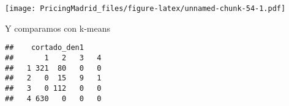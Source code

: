\documentclass[
]{article}
\newenvironment{Shaded}{\begin{snugshade}}{\end{snugshade}}
\newcommand{\FunctionTok}[1]{\textcolor[rgb]{0.00,0.00,0.00}{#1}}
\newcommand{\NormalTok}[1]{#1}
\newcommand{\SpecialCharTok}[1]{\textcolor[rgb]{0.00,0.00,0.00}{#1}}
\begin{document}
\texttt{[image: PricingMadrid\_files/figure-latex/unnamed-chunk-54-1.pdf]}

Y comparamos con k-means

\begin{Shaded}
\end{Shaded}

\begin{verbatim}
##    cortado_den1
##       1   2   3   4
##   1 321  80   0   0
##   2   0  15   9   1
##   3   0 112   0   0
##   4 630   0   0   0
\end{verbatim}
\end{document}
